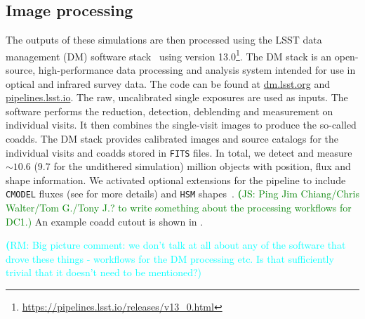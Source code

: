 \documentclass[twocolumn]{aastex62}
\newcommand{\rachel}[1]{{\textcolor{cyan}{{\textbf (RM: #1)}}}}
\newcommand{\js}[1]{{\textcolor{green}{{\textbf (JS: #1)}}}}
\begin{document}
\subsection{Image processing}
\label{sec:image_processing_pipeline}

The outputs of these simulations are then processed using the LSST data management (DM) software stack~\citep{Overview,ScienceBook,WhitePaper,2018PASJ...70S...5B,2015arXiv151207914J} using version 13.0\footnote{\url{https://pipelines.lsst.io/releases/v13_0.html}}. The DM stack is an open-source, high-performance data processing and analysis system intended for use in optical and infrared survey data. The code can be found at \url{dm.lsst.org} and \url{pipelines.lsst.io}. The raw, uncalibrated single exposures are used as inputs. The software performs the reduction, detection, deblending and measurement on individual visits. It then combines the single-visit images to produce the so-called coadds. The DM stack provides calibrated images and source catalogs for the individual visits and coadds stored in \texttt{FITS} files. In total, we detect and measure $\sim 10.6$ (9.7 for the undithered simulation) million objects with position, flux and shape information. We activated optional extensions for the pipeline to include \texttt{CMODEL} fluxes (see \cite{2018PASJ...70S...5B} for more details) and \texttt{HSM} shapes~\citep{2003MNRAS.343..459H,2005MNRAS.361.1287M}.
\js{Ping Jim Chiang/Chris Walter/Tom G./Tony J.? to write something about the processing workflows for DC1.}
An example coadd cutout is shown in .

\rachel{Big picture comment: we don't talk at all about any of the software that drove these things - workflows for the DM processing etc.  Is that sufficiently trivial that it doesn't need to be mentioned?}
\end{document}
